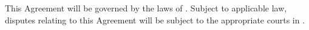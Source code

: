 %
%
%
This Agreement will be governed by the laws of \dkOrgJurisdictionCountry. Subject to
applicable law, disputes relating to this Agreement will be subject to the appropriate
courts in \textbf{\dkOrgJurisdictionForum}.
